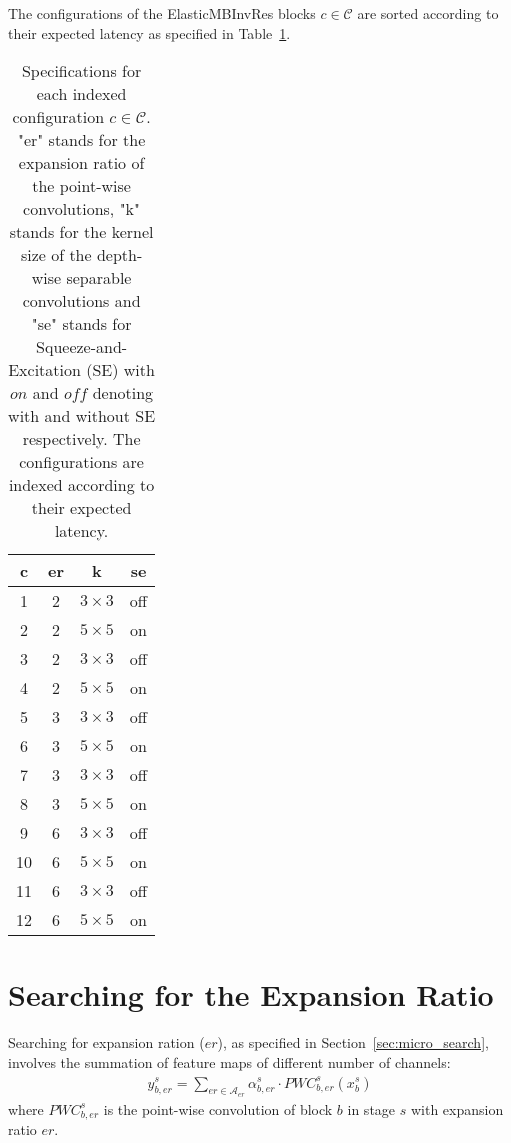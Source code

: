 \documentclass[dvipsnames,table,xcdraw]{article}
\begin{document}
The configurations of the ElasticMBInvRes blocks $c\in\mathcal{C}$ are sorted according to their expected latency as specified in Table~\ref{tab:configurations}.
\begin{table}[H]
\vspace{-1.5mm}
    \centering
    \begin{tabular}{|c||c|c|c|}
    \hline
    c & er & k & se \\
    \hline
    1 & 2 & $3\times 3$ & off \\
    2 & 2 & $5\times 5$ & on \\
    3 & 2 & $3\times 3$ & off \\
    4 & 2 & $5\times 5$ & on \\
    5 & 3 & $3\times 3$ & off \\
    6 & 3 & $5\times 5$ & on \\
    7 & 3 & $3\times 3$ & off \\
    8 & 3 & $5\times 5$ & on \\
    9 & 6 & $3\times 3$ & off \\
    10 & 6 & $5\times 5$ & on \\
    11 & 6 & $3\times 3$ & off \\
    12 & 6 & $5\times 5$ & on \\
    \hline
    \end{tabular}
    \caption{Specifications for each indexed configuration $c\in\mathcal{C}$. "er" stands for the expansion ratio of the point-wise convolutions, "k" stands for the kernel size of the depth-wise separable convolutions and "se" stands for Squeeze-and-Excitation (SE) with $on$ and $off$ denoting with and without SE respectively. The configurations are indexed according to their expected latency.}
    \label{tab:configurations}
\end{table}


\section{Searching for the Expansion Ratio}
Searching for expansion ration ($er$), as specified in Section~\ref{sec:micro_search}, involves the summation of feature maps of different number of channels:
\begin{align}\label{eqn:er_sum}
    y^s_{b, er} = \sum_{er\in\mathcal{A}_{er}} \alpha^s_{b, er}\cdot PWC^s_{b,er}(x^s_b)
\end{align}
where $PWC^s_{b,er}$ is the point-wise convolution of block $b$ in stage $s$ with expansion ratio $er$. 
\end{document}
